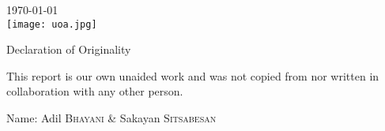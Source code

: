\begin{titlepage}
{\large \today}\\[2cm] %


\texttt{[image: uoa.jpg]}\\[1cm] %
 

\vfill %

\vspace*{25em}

{\Large Declaration of Originality}

\hspace{5em}

This report is our own unaided work and was not copied from 
nor written in collaboration with any other person.

Name: Adil \textsc{Bhayani} \& Sakayan \textsc{Sitsabesan}


\end{titlepage}


